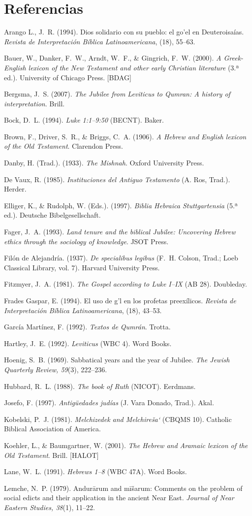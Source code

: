 \documentclass[11pt,letterpaper]{article}
\newcommand{\refapa}[1]{\par{\RaggedRight\hangindent=1.27cm\hangafter=1\noindent #1\par}\vspace{4pt}}
\begin{document}
\section*{Referencias}
\refapa{Arango L., J.~R. (1994). Dios solidario con su pueblo: el go'el en Deuteroisaías. \emph{Revista de Interpretación Bíblica Latinoamericana}, (18), 55--63.}
\refapa{Bauer, W., Danker, F.~W., Arndt, W.~F., \& Gingrich, F.~W. (2000). \emph{A Greek-English lexicon of the New Testament and other early Christian literature} (3.ª ed.). University of Chicago Press. [BDAG]}
\refapa{Bergsma, J.~S. (2007). \emph{The Jubilee from Leviticus to Qumran: A history of interpretation}. Brill.}
\refapa{Bock, D.~L. (1994). \emph{Luke 1:1--9:50} (BECNT). Baker.}
\refapa{Brown, F., Driver, S.~R., \& Briggs, C.~A. (1906). \emph{A Hebrew and English lexicon of the Old Testament}. Clarendon Press.}
\refapa{Danby, H. (Trad.). (1933). \emph{The Mishnah}. Oxford University Press.}
\refapa{De Vaux, R. (1985). \emph{Instituciones del Antiguo Testamento} (A. Ros, Trad.). Herder.}
\refapa{Elliger, K., \& Rudolph, W. (Eds.). (1997). \emph{Biblia Hebraica Stuttgartensia} (5.ª ed.). Deutsche Bibelgesellschaft.}
\refapa{Fager, J.~A. (1993). \emph{Land tenure and the biblical Jubilee: Uncovering Hebrew ethics through the sociology of knowledge}. JSOT Press.}
\refapa{Filón de Alejandría. (1937). \emph{De specialibus legibus} (F.~H. Colson, Trad.; Loeb Classical Library, vol. 7). Harvard University Press.}
\refapa{Fitzmyer, J.~A. (1981). \emph{The Gospel according to Luke I--IX} (AB 28). Doubleday.}
\refapa{Frades Gaspar, E. (1994). El uso de g'l en los profetas preexílicos. \emph{Revista de Interpretación Bíblica Latinoamericana}, (18), 43--53.}
\refapa{García Martínez, F. (1992). \emph{Textos de Qumrán}. Trotta.}
\refapa{Hartley, J.~E. (1992). \emph{Leviticus} (WBC 4). Word Books.}
\refapa{Hoenig, S.~B. (1969). Sabbatical years and the year of Jubilee. \emph{The Jewish Quarterly Review, 59}(3), 222--236.}
\refapa{Hubbard, R.~L. (1988). \emph{The book of Ruth} (NICOT). Eerdmans.}
\refapa{Josefo, F. (1997). \emph{Antigüedades judías} (J. Vara Donado, Trad.). Akal.}
\refapa{Kobelski, P.~J. (1981). \emph{Melchizedek and Melchireša`} (CBQMS 10). Catholic Biblical Association of America.}
\refapa{Koehler, L., \& Baumgartner, W. (2001). \emph{The Hebrew and Aramaic lexicon of the Old Testament}. Brill. [HALOT]}
\refapa{Lane, W.~L. (1991). \emph{Hebrews 1--8} (WBC 47A). Word Books.}
\refapa{Lemche, N.~P. (1979). Andurārum and mīšarum: Comments on the problem of social edicts and their application in the ancient Near East. \emph{Journal of Near Eastern Studies, 38}(1), 11--22.}
\end{document}
